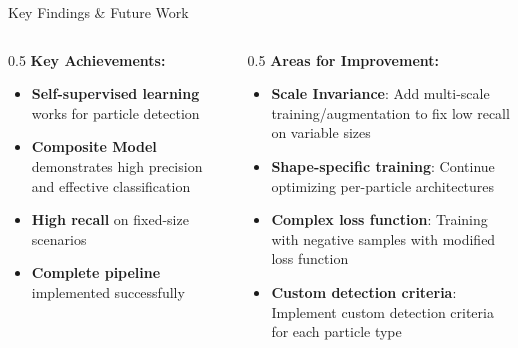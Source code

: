 \begin{frame}{Key Findings \& Future Work}
\begin{columns}
\begin{column}{0.5\textwidth}
\textbf{Key Achievements:}
\begin{itemize}
    \item \textbf{Self-supervised learning} works for particle detection
    \item \textbf{Composite Model} demonstrates high precision and effective classification
    \item \textbf{High recall} on fixed-size scenarios
    \item \textbf{Complete pipeline} implemented successfully
\end{itemize}
\end{column}
\begin{column}{0.5\textwidth}
\textbf{Areas for Improvement:}
\begin{itemize}
    \item \textbf{Scale Invariance}: Add multi-scale training/augmentation to fix low recall on variable sizes
    \item \textbf{Shape-specific training}: Continue optimizing per-particle architectures
    \item \textbf{Complex loss function}: Training with negative samples with modified loss function
    \item \textbf{Custom detection criteria}: Implement custom detection criteria for each particle type
\end{itemize}
\end{column}
\end{columns}
\end{frame}
